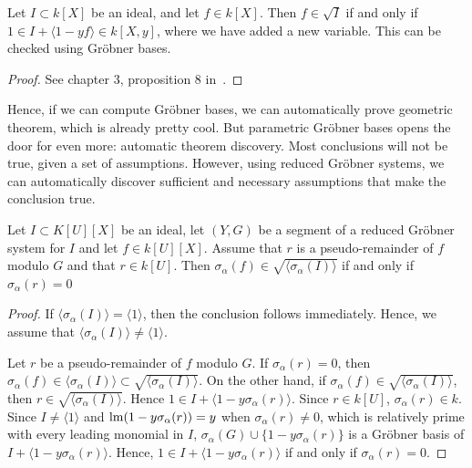 \begin{theorem}
  Let $I \subset k[X]$ be an ideal, and let $f \in k[X]$. Then $f \in \sqrt{I}$ if and only if $1 \in I + \langle 1 - yf \rangle \in k[X, y]$, where we have added a new variable. This can be checked using Gröbner bases.
\end{theorem}
\begin{proof}
  See chapter 3,  proposition 8 in~\cite{IVA}.
\end{proof}

Hence, if we can compute Gröbner bases, we can automatically prove geometric theorem, which is already pretty cool. But parametric Gröbner bases opens the door for even more: automatic theorem discovery. Most conclusions will not be true, given a set of assumptions. However, using reduced Gröbner systems, we can automatically discover sufficient and necessary assumptions that make the conclusion true.

\begin{theorem}
  Let $I \subset K[U][X]$ be an ideal, let $(Y, G)$ be a segment of a reduced Gröbner system for $I$ and let $f \in k[U][X]$. Assume that $r$ is a pseudo-remainder of $f$ modulo $G$ and that $r \in k[U]$. Then $\sigma_{\alpha}(f) \in \sqrt{\langle \sigma_{\alpha}(I) \rangle}$ if and only if $\sigma_{\alpha}(r) = 0$
\end{theorem}
\begin{proof}
  If $\langle \sigma_{\alpha}(I) \rangle = \langle 1 \rangle$, then the conclusion follows immediately. Hence, we assume that $\langle \sigma_{\alpha}(I) \rangle \neq \langle 1 \rangle$.

  Let $r$ be a pseudo-remainder of $f$ modulo $G$. If $\sigma_{\alpha}(r) = 0$, then $\sigma_{\alpha}(f) \in \langle \sigma_{\alpha}(I) \rangle \subset \sqrt{\langle \sigma_{\alpha}(I) \rangle}$. On the other hand, if $\sigma_{\alpha}(f) \in \sqrt{\langle \sigma_{\alpha}(I) \rangle}$, then $r \in \sqrt{\langle \sigma_{\alpha}(I) \rangle} $. Hence $1 \in I + \langle 1 - y \sigma_{\alpha}(r) \rangle$. Since $r \in k[U]$, $\sigma_{\alpha}(r) \in k$. Since $I \neq \langle 1 \rangle$ and $\operatorname{lm}(1 - y \sigma_{\alpha}(r)) = y$ when $\sigma_{\alpha}(r) \neq 0$, which is relatively prime with every leading monomial in $I$, $\sigma_{\alpha}(G) \cup \{1 - y \sigma_{\alpha}(r)\}$ is a Gröbner basis of $I + \langle 1 - y \sigma_{\alpha}(r) \rangle$. Hence, $1 \in I + \langle 1 - y \sigma_{\alpha}(r) \rangle$ if and only if $\sigma_{\alpha}(r) = 0$.
\end{proof}

